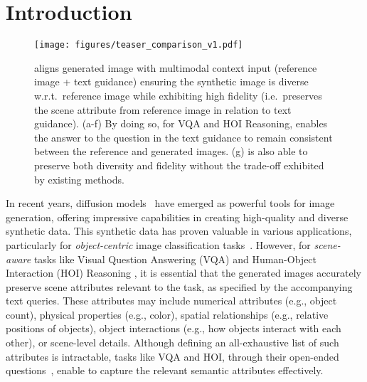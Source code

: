 \section{Introduction}
\begin{figure}[!t]
    \centering
    \texttt{[image: figures/teaser\_comparison\_v1.pdf]}
    \vspace{-9mm}
    \caption{\method aligns generated image with multimodal context input (reference image + text guidance) ensuring the synthetic image is diverse w.r.t.~reference image while exhibiting high fidelity (i.e.~preserves the scene attribute from reference image in relation to text guidance). (a-f) By doing so, for VQA and HOI Reasoning, \method enables the answer to the question in the text guidance to remain consistent between the reference and generated images. (g) \method is also able to preserve both diversity and fidelity without the trade-off exhibited by existing methods.} %
    \label{fig:teaser}
    \vspace{-6mm}
\end{figure}
In recent years, diffusion models~\citep{ho2020denoising,rombach2022high} have emerged as powerful tools for image generation, offering impressive capabilities in creating high-quality and diverse synthetic data. This synthetic data has proven valuable in various applications, particularly for \textit{object-centric} image classification tasks~\citep{shu2022testtime, feng2023diverse}. However, for \textit{scene-aware} tasks like Visual Question Answering (VQA) \citep{goyal2017making,antol2015vqa} and Human-Object Interaction (HOI) Reasoning \citep{jiang2022bongard, ulutan2020vsgnet}, it is essential that the generated images accurately preserve scene attributes relevant to the task, as specified by the accompanying text queries. These attributes may include numerical attributes (e.g., object count), physical properties (e.g., color), spatial relationships (e.g., relative positions of objects), object interactions (e.g., how objects interact with each other), or scene-level details. Although defining an all-exhaustive list of such attributes is intractable, tasks like VQA and HOI, through their open-ended questions~\citep{antol2015vqa}, enable to capture the relevant semantic attributes effectively.

